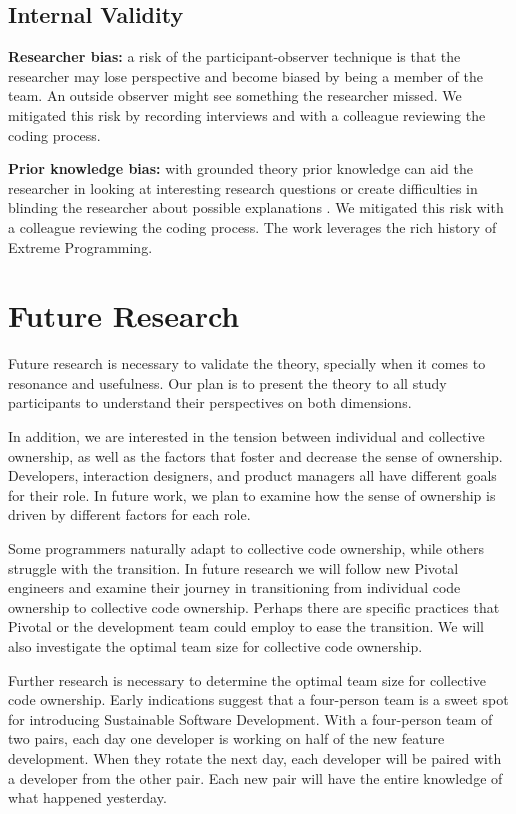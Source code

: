 \begin{table}[]
\subsection{Internal Validity}
\textbf{Researcher bias:} a risk of the participant-observer technique is that the researcher may lose perspective and become biased by being a member of the team. An outside observer might see something the researcher missed. We mitigated this risk by recording interviews and with a colleague reviewing the coding process.

\textbf{Prior knowledge bias:} with grounded theory prior knowledge can aid the researcher in looking at interesting research questions or create difficulties in blinding the researcher about possible explanations \cite{GlaserIssues}. We mitigated this risk with a colleague reviewing the coding process. The work leverages the rich history of Extreme Programming.
\section{Future Research}
Future research is necessary to validate the theory, specially when it comes to resonance and usefulness. Our plan is to present the theory to all study participants to understand their perspectives on both dimensions. 

In addition, we are interested in the tension between individual and collective ownership, as well as the factors that foster and decrease the sense of ownership. Developers, interaction designers, and product managers all have different goals for their role. In future work, we plan to examine how the sense of ownership is driven by different factors for each role.

Some programmers naturally adapt to collective code ownership, while others struggle with the transition. In future research we will follow new Pivotal engineers and examine their journey in transitioning from individual code ownership to collective code ownership. Perhaps there are 
specific practices that Pivotal or the development team could employ to ease the transition. We will also investigate the optimal team size for collective code ownership. 

Further research is necessary to determine the optimal team size for collective code ownership. Early indications suggest that a four-person team is a sweet spot for introducing Sustainable Software Development. With a four-person team of two pairs, each day one developer is working on half of the new feature development. When they rotate the next day, each developer will be paired with a developer from the other pair. Each new pair will have the entire knowledge of what happened yesterday. 



\end{table}

